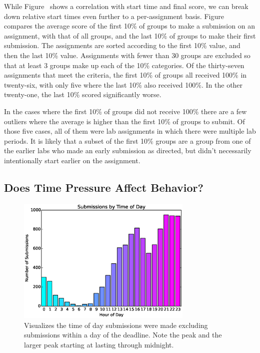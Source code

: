 While Figure~ shows a correlation with start
time and final score, we can break down relative start times even further to a
per-assignment basis. Figure~ compares the average
score of the first 10\% of groups to make a submission on an assignment, with
that of all groups, and the last 10\% of groups to make their first
submission. The assignments are sorted according to the first 10\% value, and
then the last 10\% value. Assignments with fewer than 30 groups are excluded so
that at least 3 groups make up each of the 10\% categories. Of the thirty-seven
assignments that meet the criteria, the first 10\% of groups all received 100\%
in twenty-six, with only five where the last 10\% also received 100\%. In the
other twenty-one, the last 10\% scored significantly worse.

In the cases where the first 10\% of groups did not receive 100\% there are a
few outliers where the average is higher than the first 10\% of groups to
submit. Of those five cases, all of them were lab assignments in which there
were multiple lab periods. It is likely that a subset of the first 10\% groups
are a group from one of the earlier labs who made an early submission as
directed, but didn't necessarily intentionally start earlier on the assignment.

\subsection{Does Time Pressure Affect Behavior?}

\begin{figure}[!t]
\centering
\includegraphics[width=3.3in]{graphs/Submissions_by_Time_of_Day.eps}
\caption{Visualizes the time of day submissions were made excluding submissions
  within a day of the deadline. Note the  peak and the larger peak
  starting at  lasting through midnight.}
\end{figure}


